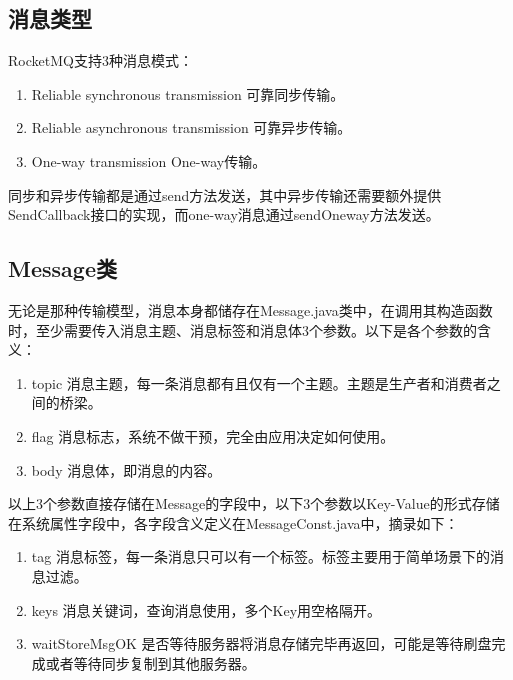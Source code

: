 \subsection{消息类型}
RocketMQ支持3种消息模式：

\begin{enumerate}[itemindent=1em]

\item Reliable synchronous transmission 可靠同步传输。

\item Reliable asynchronous transmission 可靠异步传输。

\item One-way transmission One-way传输。

\end{enumerate} 

同步和异步传输都是通过send方法发送，其中异步传输还需要额外提供SendCallback接口的实现，而one-way消息通过sendOneway方法发送。

\subsection{Message类}
无论是那种传输模型，消息本身都储存在Message.java类中，在调用其构造函数时，至少需要传入消息主题、消息标签和消息体3个参数。以下是各个参数的含义：

\begin{enumerate}[itemindent=1em]

\item topic 消息主题，每一条消息都有且仅有一个主题。主题是生产者和消费者之间的桥梁。

\item flag 消息标志，系统不做干预，完全由应用决定如何使用。

\item body 消息体，即消息的内容。

\end{enumerate} 


以上3个参数直接存储在Message的字段中，以下3个参数以Key-Value的形式存储在系统属性字段中，各字段含义定义在MessageConst.java中，摘录如下：
\begin{enumerate}[itemindent=1em]

\item tag 消息标签，每一条消息只可以有一个标签。标签主要用于简单场景下的消息过滤\cite{filter-example}。

\item keys 消息关键词，查询消息使用，多个Key用空格隔开。

\item waitStoreMsgOK 是否等待服务器将消息存储完毕再返回，可能是等待刷盘完成或者等待同步复制到其他服务器。

\end{enumerate} 


